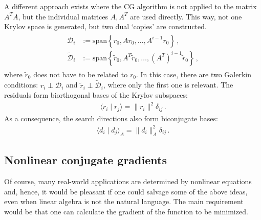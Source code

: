     A different approach exists where the CG algorithm is not applied to the matrix $A^T\!A$, but the individual matrices $A,A^T$ are used directly. This way, not one Krylov space is generated, but two dual `copies' are constructed.
    \begin{gather}
        \begin{aligned}
            \mathcal{D}_i &:= \mathrm{span}\left\{r_0,Ar_0,\ldots,A^{i-1}r_0\right\}\,,\\
            \widetilde{\mathcal{D}}_i &:= \mathrm{span}\left\{\widetilde{r}_0,A^T\widetilde{r}_0,\ldots,(A^T)^{i-1}\widetilde{r}_0\right\}\,,
        \end{aligned}
    \end{gather}
    where $\widetilde{r}_0$ does not have to be related to $r_0$. In this case, there are two Galerkin conditions: $r_i\perp\mathcal{D}_i$ and $\widetilde{r}_i\perp\widetilde{\mathcal{D}}_i$, where only the first one is relevant. The residuals form biorthogonal bases of the Krylov subspaces:
    \begin{gather}
        \langle r_i\mid r_j \rangle = \|r_i\|^2\delta_{ij}\,.
    \end{gather}
    As a consequence, the search directions also form biconjugate bases:
    \begin{gather}
        \langle d_i\mid d_j \rangle_A = \|d_i\|_A^2\delta_{ij}\,.
    \end{gather}

\subsection{Nonlinear conjugate gradients}

    Of course, many real-world applications are determined by nonlinear equations and, hence, it would be pleasant if one could salvage some of the above ideas, even when linear algebra is not the natural language. The main requirement would be that one can calculate the gradient of the function to be minimized.

